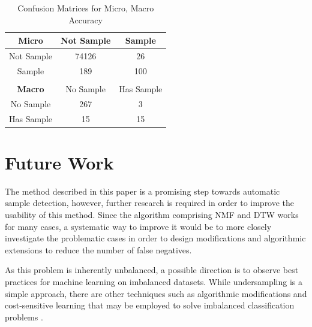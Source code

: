 \documentclass{article}
\begin{document}

\begin{table}[t]
\centering
\label{conf_mat}
\begin{tabular}{ccc}
\multicolumn{1}{c|}{\textbf{Micro}} & \multicolumn{1}{c|}{Not Sample} & \multicolumn{1}{c}{Sample}     \\ \hline
\multicolumn{1}{c|}{Not Sample}     & \multicolumn{1}{c|}{74126}      & \multicolumn{1}{c}{26}         \\ \hline
\multicolumn{1}{c|}{Sample}         & \multicolumn{1}{c|}{189}        & \multicolumn{1}{c}{100}        \\ %
                                     &                                 &                                 \\ %
\multicolumn{1}{c|}{\textbf{Macro}} & \multicolumn{1}{c|}{No Sample}  & \multicolumn{1}{c}{Has Sample} \\ \hline
\multicolumn{1}{c|}{No Sample}      & \multicolumn{1}{c|}{267}        & \multicolumn{1}{c}{3}          \\ \hline
\multicolumn{1}{c|}{Has Sample}     & \multicolumn{1}{c|}{15}         & \multicolumn{1}{c}{15}         \\ %
\end{tabular}
\caption{Confusion Matrices for Micro, Macro Accuracy}
\end{table}

\section{Future Work}

The method described in this paper is a promising step towards automatic sample detection, however, further research is required in order to improve the usability of this method. Since the algorithm comprising NMF and DTW works for many cases, a systematic way to improve it would be to more closely investigate the problematic cases in order to design modifications and algorithmic extensions to reduce the number of false negatives.

As this problem is inherently unbalanced, a possible direction is to observe best practices for machine learning on imbalanced datasets. While undersampling is a simple approach, there are other techniques such as algorithmic modifications and cost-sensitive learning that may be employed to solve imbalanced classification problems \cite{lopez2013insight}.
\end{document}
